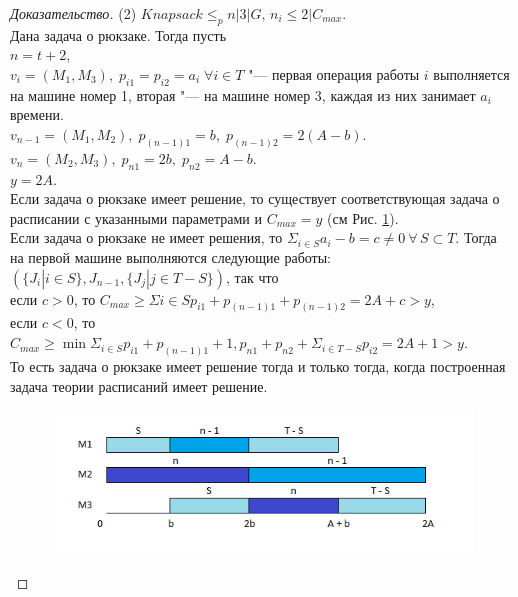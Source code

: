 \documentclass[a4paper,12pt]{article}
\theoremstyle{plain} %
\theoremstyle{definition} %
\theoremstyle{remark} %
\begin{document}
\begin{proof}[Доказательство]
	\par\bigskip
	(2) $Knapsack \le_p n|3|G, \, n_i \le 2|C_{max}$.\\
	Дана задача о рюкзаке. Тогда пусть\\
	$n = t + 2$,\\
	$v_i = (M_1, M_3), \; p_{i1} = p_{i2} = a_i \; \forall i \in T$ "--- первая операция работы $i$ выполняется на машине номер 1, вторая "--- на машине номер 3, каждая из них занимает $a_i$ времени.\\
	$v_{n-1} = (M_1, M_2), \; p_{(n-1)1} = b, \; p_{(n-1)2} = 2(A-b)$.\\
	$v_n = (M_2, M_3), \; p_{n1} = 2b, \; p_{n2} = A - b$.\\
	$y = 2A$.\\
	Если задача о рюкзаке имеет решение, то существует соответствующая задача о расписании с указанными параметрами и $C_{max} = y$ (см Рис. \ref{fig_2}).\\
	Если задача о рюкзаке не имеет решения, то $\Sigma_{i \in S}a_i - b = c \ne 0 \: \forall \, S \subset T$. Тогда на первой машине выполняются следующие работы: $(\{J_i| i \in S\}, J_{n-1}, \{J_j| j \in T-S\})$, так что\\
	если $c > 0$, то $C_{max} \ge \Sigma{i \in S}p_{i1} + p_{(n-1)1} + p_{(n-1)2} = 2A + c > y$,\\
	если $c < 0$, то $C_{max} \ge \min{\Sigma_{i \in S}p_{i1} + p_{(n-1)1} + 1, p_{n1}} + p_{n2} + \Sigma_{i \in T-S}p_{i2} = 2A + 1 > y$.\\
	То есть задача о рюкзаке имеет решение тогда и только тогда, когда построенная задача теории расписаний имеет решение.
	\begin{figure}[h!]
		\begin{center}
			\includegraphics[scale=0.65]{pic_2.png}
			\caption[]{}
			\label{fig_2}
		\end{center}
	\end{figure}
	

\end{proof}
\end{document}
